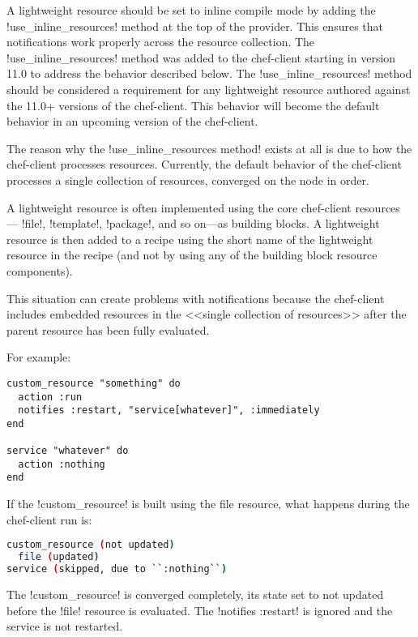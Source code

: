 A lightweight resource should be set to inline compile mode by adding the \inline!use_inline_resources! method at the top of the provider. This ensures that notifications work properly across the resource collection. The \inline!use_inline_resources! method was added to the chef-client starting in version 11.0 to address the behavior described below. The \inline!use_inline_resources! method should be considered a requirement for any lightweight resource authored against the 11.0+ versions of the chef-client. This behavior will become the default behavior in an upcoming version of the chef-client.

The reason why the \inline!use_inline_resources method! exists at all is due to how the chef-client processes resources. Currently, the default behavior of the chef-client processes a single collection of resources, converged on the node in order.

A lightweight resource is often implemented using the core chef-client resources — \inline!file!, \inline!template!, \inline!package!, and so on—as building blocks. A lightweight resource is then added to a recipe using the short name of the lightweight resource in the recipe (and not by using any of the building block resource components).

This situation can create problems with notifications because the chef-client includes embedded resources in the <<single collection of resources>> after the parent resource has been fully evaluated.

For example:

\begin{lstlisting}[label=lst:cookbook-lwrp-inline-resources1]
custom_resource "something" do
  action :run
  notifies :restart, "service[whatever]", :immediately
end

service "whatever" do
  action :nothing
end
\end{lstlisting}

If the \inline!custom_resource! is built using the file resource, what happens during the chef-client run is:

\begin{lstlisting}[language=Bash,label=lst:cookbook-lwrp-inline-resources2]
custom_resource (not updated)
  file (updated)
service (skipped, due to ``:nothing``)
\end{lstlisting}

The \inline!custom_resource! is converged completely, its state set to not updated before the \inline!file! resource is evaluated. The \inline!notifies :restart! is ignored and the service is not restarted.

